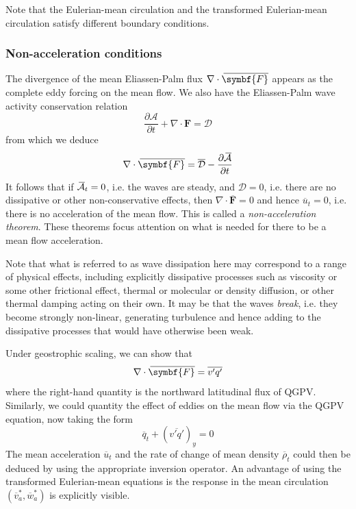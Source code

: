\documentclass{jknotes}
\newcommand{\myol}[2][3]{{}\mkern#1mu\overline{\mkern-#1mu#2}}
\begin{document}
Note that the Eulerian-mean circulation and the transformed Eulerian-mean
circulation satisfy different boundary conditions.

\subsubsection{Non-acceleration conditions}
The divergence of the mean Eliassen-Palm flux $\nabla \cdot
\myol[4]{\symbf{F}}$ appears as the complete eddy forcing on the mean flow. We
also have the Eliassen-Palm wave activity conservation relation
\begin{equation}
	\frac{\partial \mathcal{A}}{\partial t} + \nabla \cdot \symbf{F} =
	\mathcal{D}
\end{equation}
from which we deduce
\begin{equation}
	\nabla \cdot \myol[4]{\symbf{F}} = \overline{\mathcal{D}} -
	\frac{\partial \myol{\mathcal{A}}}{\partial t}
\end{equation}
It follows that if $\myol{\mathcal{A}}_t = 0$, i.e. the waves are steady, and
$\mathcal{D} = 0$, i.e. there are no dissipative or other non-conservative
effects, then $\nabla \cdot \overline{\symbf{F}} = 0$ and hence
$\overline{u}_t = 0$, i.e. there is no acceleration of the mean flow. This is
called a \emph{non-acceleration theorem}. These theorems focus attention on
what is needed for there to be a mean flow acceleration.

Note that what is referred to as wave dissipation here may correspond to a
range of physical effects, including explicitly dissipative processes such as
viscosity or some other frictional effect, thermal or molecular or density
diffusion, or other thermal damping acting on their own. It may be that the
waves \emph{break}, i.e. they become strongly non-linear, generating
turbulence and hence adding to the dissipative processes that would have
otherwise been weak.

Under geostrophic scaling, we can show that
\begin{equation}
	\nabla \cdot \myol[4]{\symbf{F}} = \overline{v'q'}
\end{equation}
where the right-hand quantity is the northward latitudinal flux of QGPV.
Similarly, we could quantity the effect of eddies on the mean flow via the
QGPV equation, now taking the form
\begin{equation}
	\overline{q}_t + (\overline{v'q'})_y = 0
\end{equation}
The mean acceleration $\overline{u}_t$ and the rate of change of mean density
$\overline{\rho}_t$ could then be deduced by using the appropriate inversion
operator. An advantage of using the transformed Eulerian-mean equations is
the response in the mean circulation $(\overline{v}_a^*, \overline{w}_a^*)$ is
explicitly visible.
\end{document}
